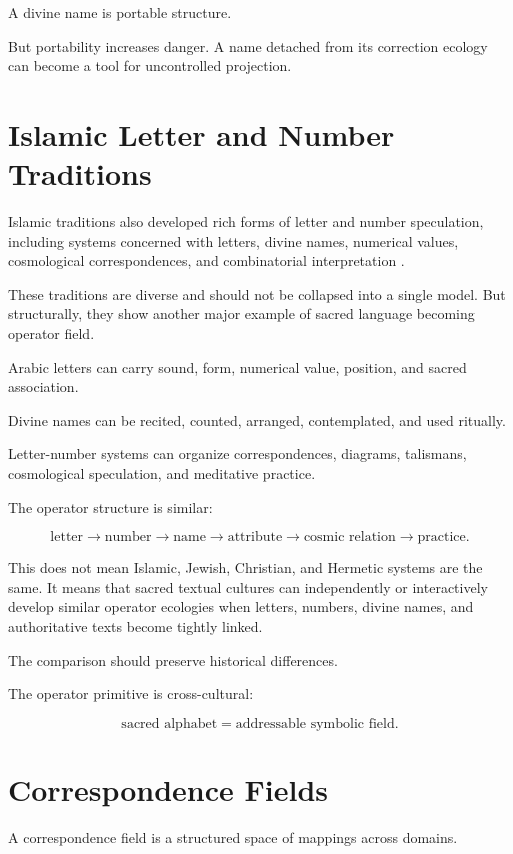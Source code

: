 \documentclass[11pt]{book}
\begin{document}
A divine name is portable structure.

But portability increases danger. A name detached from its correction ecology can become a tool for uncontrolled projection.

\section{Islamic Letter and Number Traditions}

Islamic traditions also developed rich forms of letter and number speculation, including systems concerned with letters, divine names, numerical values, cosmological correspondences, and combinatorial interpretation \cite{Eco1995SearchPerfectLanguage}.

These traditions are diverse and should not be collapsed into a single model. But structurally, they show another major example of sacred language becoming operator field.

Arabic letters can carry sound, form, numerical value, position, and sacred association.

Divine names can be recited, counted, arranged, contemplated, and used ritually.

Letter-number systems can organize correspondences, diagrams, talismans, cosmological speculation, and meditative practice.

The operator structure is similar:

\[
\text{letter}
\rightarrow
\text{number}
\rightarrow
\text{name}
\rightarrow
\text{attribute}
\rightarrow
\text{cosmic relation}
\rightarrow
\text{practice}.
\]

This does not mean Islamic, Jewish, Christian, and Hermetic systems are the same. It means that sacred textual cultures can independently or interactively develop similar operator ecologies when letters, numbers, divine names, and authoritative texts become tightly linked.

The comparison should preserve historical differences.

The operator primitive is cross-cultural:

\[
\text{sacred alphabet} = \text{addressable symbolic field}.
\]

\section{Correspondence Fields}

A correspondence field is a structured space of mappings across domains.
\end{document}
